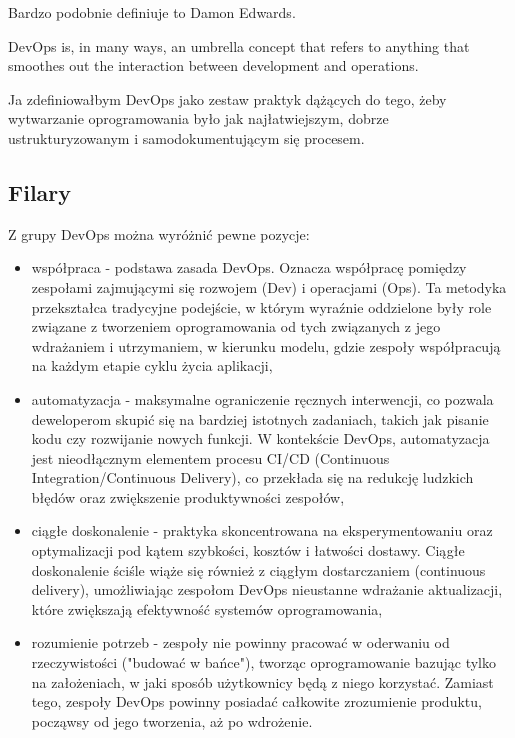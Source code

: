 \documentclass{article}
\begin{document}
Bardzo podobnie definiuje to Damon Edwards\cite{damonEdwards}.

\begin{displayquote}
    DevOps is, in many ways, an umbrella concept that refers to anything that smoothes out the interaction between development and operations.
\end{displayquote}

Ja zdefiniowałbym DevOps jako zestaw praktyk dążących do tego, żeby wytwarzanie oprogramowania było jak najłatwiejszym, dobrze ustrukturyzowanym i samodokumentującym się procesem.


\subsection{Filary}
Z grupy DevOps można wyróżnić pewne pozycje:
\begin{itemize}
    \item współpraca - podstawa zasada DevOps. Oznacza współpracę pomiędzy zespołami zajmującymi się rozwojem (Dev) i operacjami (Ops). Ta metodyka przekształca tradycyjne podejście, w którym wyraźnie oddzielone były role związane z tworzeniem oprogramowania od tych związanych z jego wdrażaniem i utrzymaniem, w kierunku modelu, gdzie zespoły współpracują na każdym etapie cyklu życia aplikacji,
    \item automatyzacja - maksymalne ograniczenie ręcznych interwencji, co pozwala deweloperom skupić się na bardziej istotnych zadaniach, takich jak pisanie kodu czy rozwijanie nowych funkcji. W kontekście DevOps, automatyzacja jest nieodłącznym elementem procesu CI/CD (Continuous Integration/Continuous Delivery), co przekłada się na redukcję ludzkich błędów oraz zwiększenie produktywności zespołów,
    \item ciągłe doskonalenie - praktyka skoncentrowana na eksperymentowaniu oraz optymalizacji pod kątem szybkości, kosztów i łatwości dostawy. Ciągłe doskonalenie ściśle wiąże się również z ciągłym dostarczaniem (continuous delivery), umożliwiając zespołom DevOps nieustanne wdrażanie aktualizacji, które zwiększają efektywność systemów oprogramowania,
    \item rozumienie potrzeb - zespoły nie powinny pracować w oderwaniu od rzeczywistości ("budować w bańce"), tworząc oprogramowanie bazując tylko na założeniach, w jaki sposób użytkownicy będą z niego korzystać. Zamiast tego, zespoły DevOps powinny posiadać całkowite zrozumienie produktu, począwsy od jego tworzenia, aż po wdrożenie.
\end{itemize}
\end{document}
